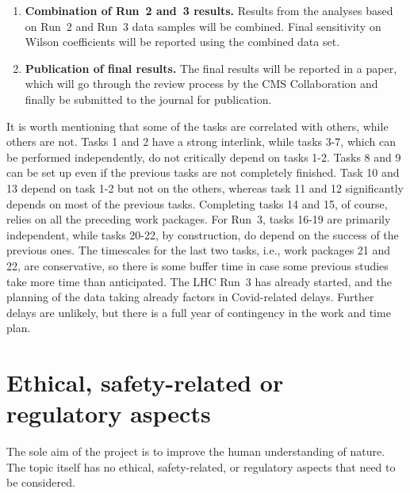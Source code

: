 \documentclass[a4paper,11pt]{article}
\begin{document}
\begin{enumerate}[noitemsep,topsep=0pt]
\item {\bf Combination of Run~2 and~3 results.} Results from the analyses based on Run~2 and Run~3 data samples will be combined. Final sensitivity on Wilson coefficients will be reported using the combined data set. 

\item {\bf Publication of final results.} The final results will be reported in a paper, which will go through the review process by the CMS Collaboration and finally be submitted to the journal for publication. 

\end{enumerate}

It is worth mentioning that some of the tasks are correlated with others, while others are not. 
Tasks 1 and 2 have a strong interlink, while tasks 3-7, which can be performed independently, do not critically depend on tasks 1-2. 
Tasks 8 and 9 can be set up even if the previous tasks are not completely finished.
Task 10 and 13 depend on task 1-2 but not on the others, whereas task 11 and 12 significantly depends on most of the previous tasks.
Completing tasks 14 and 15, of course, relies on all the preceding work packages. 
For Run~3, tasks 16-19 are primarily independent, while tasks 20-22, by construction, do depend on the success of the previous ones.
The timescales for the last two tasks, i.e., work packages 21 and 22, are conservative, so there is some buffer time in case some previous studies take more time than anticipated.
The LHC Run~3 has already started, and the planning of the data taking already factors in Covid-related delays. Further delays are unlikely, but there is a full year of contingency in the work and time plan.


\section{Ethical, safety-related or regulatory aspects}

The sole aim of the project is to improve the human understanding of nature. 
The topic itself has no ethical, safety-related, or regulatory aspects that need to be considered.
\end{document}

